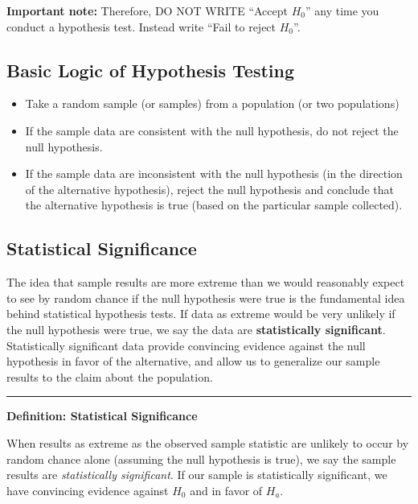 \documentclass[]{tufte-book}
\providecommand{\tightlist}{%
  \setlength{\itemsep}{0pt}\setlength{\parskip}{0pt}}
\begin{document}
\textbf{Important note:} Therefore, DO NOT WRITE ``Accept \(H_0\)'' any
time you conduct a hypothesis test. Instead write ``Fail to reject
\(H_0\)''.

\subsection{Basic Logic of Hypothesis
Testing}\label{basic-logic-of-hypothesis-testing}

\begin{itemize}
\tightlist
\item
  Take a random sample (or samples) from a population (or two
  populations)
\item
  If the sample data are consistent with the null hypothesis, do not
  reject the null hypothesis.
\item
  If the sample data are inconsistent with the null hypothesis (in the
  direction of the alternative hypothesis), reject the null hypothesis
  and conclude that the alternative hypothesis is true (based on the
  particular sample collected).
\end{itemize}

\subsection{Statistical Significance}\label{statistical-significance}

The idea that sample results are more extreme than we would reasonably
expect to see by random chance if the null hypothesis were true is the
fundamental idea behind statistical hypothesis tests. If data as extreme
would be very unlikely if the null hypothesis were true, we say the data
are \textbf{statistically significant}. Statistically significant data
provide convincing evidence against the null hypothesis in favor of the
alternative, and allow us to generalize our sample results to the claim
about the population.

\begin{center}\rule{\linewidth}{\linethickness}\end{center}

\textbf{Definition: Statistical Significance}

When results as extreme as the observed sample statistic are unlikely to
occur by random chance alone (assuming the null hypothesis is true), we
say the sample results are \emph{statistically significant}. If our
sample is statistically significant, we have convincing evidence against
\(H_0\) and in favor of \(H_a\).
\end{document}
